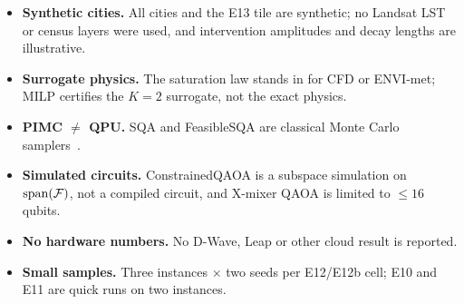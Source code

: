 \begin{itemize}
\item \textbf{Synthetic cities.} All cities and the E13 tile are synthetic; no Landsat LST or census
layers were used, and intervention amplitudes and decay lengths are illustrative.
\item \textbf{Surrogate physics.} The saturation law stands in for CFD or ENVI-met; MILP certifies the
$K{=}2$ surrogate, not the exact physics.
\item \textbf{PIMC $\neq$ QPU.} SQA and FeasibleSQA are classical Monte Carlo samplers~\cite{heim2015}.
\item \textbf{Simulated circuits.} ConstrainedQAOA is a subspace simulation on $\mathrm{span}(\mathcal{F})$,
not a compiled circuit, and X-mixer QAOA is limited to $\le16$ qubits.
\item \textbf{No hardware numbers.} No D-Wave, Leap or other cloud result is reported.
\item \textbf{Small samples.} Three instances $\times$ two seeds per E12/E12b cell; E10 and E11 are quick
runs on two instances.
\end{itemize}
